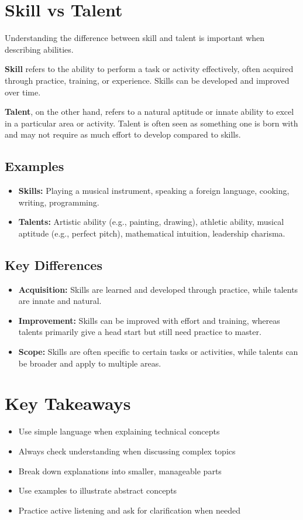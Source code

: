 \section{Skill vs Talent}

Understanding the difference between skill and talent is important when describing abilities.

\textbf{Skill} refers to the ability to perform a task or activity effectively, often acquired through practice, training, or experience. Skills can be developed and improved over time.

\textbf{Talent}, on the other hand, refers to a natural aptitude or innate ability to excel in a particular area or activity. Talent is often seen as something one is born with and may not require as much effort to develop compared to skills.

\subsection{Examples}
\begin{itemize}
    \item \textbf{Skills:} Playing a musical instrument, speaking a foreign language, cooking, writing, programming.
    \item \textbf{Talents:} Artistic ability (e.g., painting, drawing), athletic ability, musical aptitude (e.g., perfect pitch), mathematical intuition, leadership charisma.
\end{itemize}

\subsection{Key Differences}
\begin{itemize}
    \item \textbf{Acquisition:} Skills are learned and developed through practice, while talents are innate and natural.
    \item \textbf{Improvement:} Skills can be improved with effort and training, whereas talents primarily give a head start but still need practice to master.
    \item \textbf{Scope:} Skills are often specific to certain tasks or activities, while talents can be broader and apply to multiple areas.
\end{itemize}

\section{Key Takeaways}
\begin{itemize}
    \item Use simple language when explaining technical concepts
    \item Always check understanding when discussing complex topics
    \item Break down explanations into smaller, manageable parts
    \item Use examples to illustrate abstract concepts
    \item Practice active listening and ask for clarification when needed
\end{itemize}


